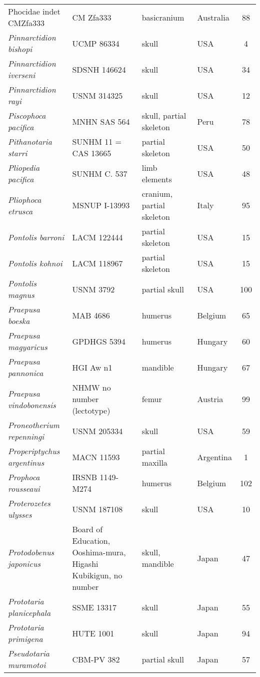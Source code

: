 \begin{longtable}{p{}p{}p{}lc}
Phocidae indet CMZfa333	& CM Zfa333 & 	basicranium & 	Australia & 88\\
\textit{Pinnarctidion bishopi} &	UCMP 86334 & 	skull & 	USA & 4\\
\textit{Pinnarctidion iverseni} &	SDSNH 146624 & 	skull & 	USA & 34\\
\textit{Pinnarctidion rayi} &	USNM 314325 & 	skull & 	USA & 12\\
\textit{Piscophoca pacifica} &	MNHN SAS 564 & 	skull, partial skeleton	 & Peru & 78\\
\textit{Pithanotaria starri} &	SUNHM 11 = CAS 13665 & 	partial skeleton & 	USA & 50\\
\textit{Pliopedia pacifica} &	SUNHM C. 537 & 	limb elements & 	USA & 48\\
\textit{Pliophoca etrusca} &	MSNUP I-13993 & 	cranium, partial skeleton & 	Italy & 95\\
\textit{Pontolis barroni} &	LACM 122444 & 	partial skeleton & 	USA & 15\\
\textit{Pontolis kohnoi} &	LACM 118967 & 	partial skeleton & 	USA & 15\\
\textit{Pontolis magnus} &	USNM 3792 & 	partial skull & 	USA & 100\\
\textit{Praepusa boeska} &	MAB 4686 & 	humerus & 	Belgium & 	65\\
\textit{Praepusa magyaricus} &	GPDHGS 5394 & 	humerus & 	Hungary & 60\\
\textit{Praepusa pannonica} &	HGI Aw n1 & 	mandible & 	Hungary & 67\\
\textit{Praepusa vindobonensis} &	NHMW no number (lectotype) & 	femur & 	Austria & 99\\
\textit{Proneotherium repenningi} &	USNM 205334 & 	skull & 	USA & 59\\
\textit{Properiptychus argentinus} &	MACN 11593 & 	partial maxilla & 	Argentina & 1\\
\textit{Prophoca rousseaui} &	IRSNB 1149-M274 & 	humerus	 & Belgium	& 102\\
\textit{Proterozetes ulysses} &	USNM 187108 & 	skull & 	USA	 & 10\\
\textit{Protodobenus japonicus} & Board of Education, Ooshima-mura, Higashi Kubikigun, no number & 	skull, mandible & 	Japan & 47\\
\textit{Prototaria planicephala} &	SSME 13317 & 	skull & 	Japan & 55\\
\textit{Prototaria primigena} &	HUTE 1001 & 	skull & 	Japan & 94\\
\textit{Pseudotaria muramotoi} &	CBM-PV 382 & 	partial skull & 	Japan & 57\\

\end{longtable}
